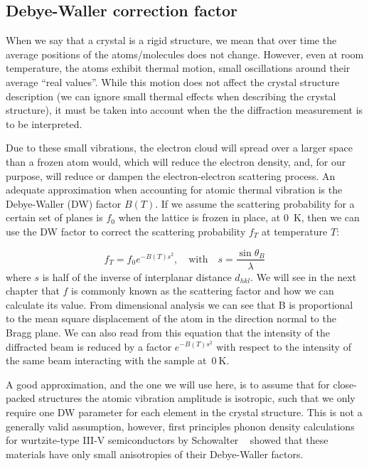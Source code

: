 \subsection{Debye-Waller correction factor}
\label{Sec:DWf}

When we say that a crystal is a rigid structure, we mean that over time the average positions of the atoms/molecules does not change. However, even at room temperature, the atoms exhibit thermal motion, small oscillations around their average ``real values''. While this motion does not affect the crystal structure description (\ie we can ignore small thermal effects when describing the crystal structure), it must be taken into account when the the diffraction measurement is to be interpreted.

Due to these small vibrations, the electron cloud will spread over a larger space than a frozen atom would, which will reduce the electron density, and, for our purpose, will reduce or dampen the electron-electron scattering process. An adequate approximation when accounting for atomic thermal vibration is the Debye-Waller (DW) factor $B(T)$. If we assume the scattering probability for a certain set of planes is $f_0$ when the lattice is frozen in place, \ie at \SI{0}{\kelvin}, then we can use the DW factor to correct the scattering probability $f_T$ at temperature $T$:

\begin{equation}
\label{eq:correctedScattter}
f_T=f_0 e^{-B(T)s^2}, \quad \text{with}\quad s=\frac{\sin\theta_B}{\lambda}
\end{equation}
where $s$ is half of the inverse of interplanar distance $d_{hkl}$. We will see in the next chapter that $f$ is commonly known as the scattering factor and how we can calculate its value. From dimensional analysis we can see that B is proportional to the mean square displacement of the atom in the direction normal to the Bragg plane. We can also read from this equation that the intensity of the diffracted beam is reduced by a factor $e^{-B(T)s^2}$ with respect to the intensity of the same beam interacting with the sample at~$\SI{0}{\kelvin}$.

A good approximation, and the one we will use here, is to assume that for close-packed structures the atomic vibration amplitude is isotropic, such that we only require one DW parameter for each element in the crystal structure. This is not a generally valid assumption, however, first principles phonon density calculations for wurtzite-type III-V semiconductors by Schowalter \etal~\cite{Schowalter09} showed that these materials have only small anisotropies of their Debye-Waller factors.

